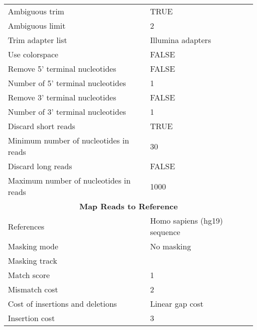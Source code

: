 \begin{scriptsize}
\begin{center}
\begin{longtable}{ll}
Ambiguous trim                               & TRUE                                           \\
Ambiguous limit                              & 2                                              \\
Trim adapter list                            & Illumina adapters                              \\
Use colorspace                               & FALSE                                          \\
Remove 5' terminal nucleotides               & FALSE                                          \\
Number of 5' terminal nucleotides            & 1                                              \\
Remove 3' terminal nucleotides               & FALSE                                          \\
Number of 3' terminal nucleotides            & 1                                              \\
Discard short reads                          & TRUE                                           \\
Minimum number of nucleotides in reads       & 30                                             \\
Discard long reads                           & FALSE                                          \\
Maximum number of nucleotides in reads       & 1000                                           \\
\midrule
\multicolumn{2}{c}{\textbf{Map Reads to Reference}}    \\\midrule
References                                   & Homo sapiens (hg19) sequence                   \\
Masking mode                                 & No masking                                     \\
Masking track                                &                                                \\
Match score                                  & 1                                              \\
Mismatch cost                                & 2                                              \\
Cost of insertions and deletions             & Linear gap cost                                \\
Insertion cost                               & 3                                              \\

\end{longtable}
\end{center}
\end{scriptsize}
